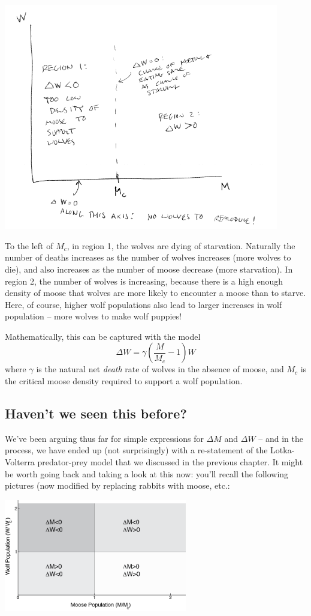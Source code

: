 \documentclass{tufte-handout}
\newcommand{\beforefig}{\vspace{0.2in}}
\newcommand{\afterfig}{\vspace{0.2in}}
\begin{document}
\includegraphics[width=12cm]{figs/DeltaWPhasePlane}

To the left of $M_c$, in region 1, the wolves are dying of starvation.  Naturally the number of deaths increases as the number of wolves increases (more wolves to die), and also increases as the number of moose decrease (more starvation).  In region 2, the number of wolves is increasing, because there is a high enough density of moose that wolves are more likely to encounter a moose than to starve.  Here, of course, higher wolf populations also lead to larger increases in wolf population -- more wolves to make wolf puppies!

Mathematically, this can be captured with the model
$$\Delta W = \gamma(\frac{M}{M_c}-1)W$$
where $\gamma$ is the natural net {\it death} rate of wolves in the absence of moose, and $M_c$ is the critical moose density required to support a wolf population.

\subsection{Haven't we seen this before?}

We've been arguing thus far for simple expressions for $\Delta M$ and $\Delta W$ -- and in the process, we have ended up (not surprisingly) with a re-statement of the Lotka-Volterra predator-prey model that we discussed in the previous chapter.   It might be worth going back and taking a look at this now:  you'll recall the following pictures (now modified by replacing rabbits with moose, etc.:

\beforefig
\centerline{\includegraphics[width=8cm]{figs/WolfMoosePhasePlaneRegions}}
\afterfig
\end{document}
